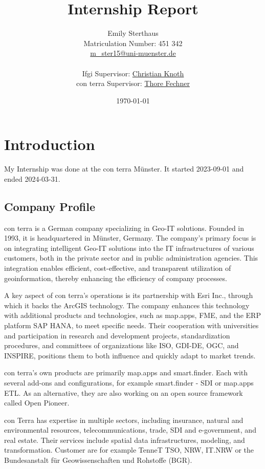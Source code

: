 \documentclass[11pt, titlepage, a4paper]{article}
\title{Internship Report}
\author{Emily Sterthaus \\ Matriculation Number: 451 342 \\ \href{mailto:m_ster15@uni-muenster.de}{m\_ster15@uni-muenster.de}\\ \\
\small Ifgi Supervisor: \href{mailto:christian.knoth@uni-muenster.de}{Christian Knoth}\\ \small con terra Supervisor: \href{mailto:t.fechner@conterra.de}{Thore Fechner}
}
\date{\today}
\begin{document}
\maketitle
\newpage
\tableofcontents
\newpage

\section{Introduction}

My Internship was done at the con terra Münster. It started 2023-09-01 and ended 2024-03-31.
\subsection{Company Profile}

con terra is a German company specializing in Geo-IT solutions. Founded in 1993, it is headquartered in Münster, Germany. The company's primary focus is on integrating intelligent Geo-IT solutions into the IT infrastructures of various customers, both in the private sector and in public administration agencies. This integration enables efficient, cost-effective, and transparent utilization of geoinformation, thereby enhancing the efficiency of company processes.

A key aspect of con terra's operations is its partnership with Esri Inc., through which it backs the ArcGIS technology. The company enhances this technology with additional products and technologies, such as map.apps, FME, and the ERP platform SAP HANA, to meet specific needs. Their cooperation with universities and participation in research and development projects, standardization procedures, and committees of organizations like ISO, GDI-DE, OGC, and INSPIRE, positions them to both influence and quickly adapt to market trends.

con terra's own products are primarily map.apps and smart.finder. Each with several add-ons and configurations, for example smart.finder - SDI or map.apps ETL. As an alternative, they are also working on an open source framework called Open Pioneer.

con Terra has expertise in multiple sectors, including insurance, natural and environmental resources, telecommunications, trade, SDI and e-government, and real estate. Their services include spatial data infrastructures, modeling, and transformation. Customer are for example TenneT TSO,   NRW, IT.NRW or the Bundesanstalt für Geowissenschaften und Rohstoffe  (BGR).
\end{document}
